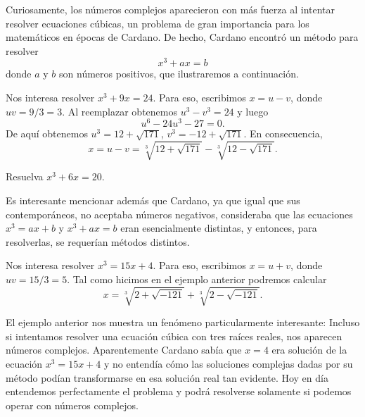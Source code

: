 Curiosamente, los números complejos aparecieron con más fuerza al intentar
resolver ecuaciones cúbicas, un problema de gran importancia para los
matemáticos en épocas de Cardano. De hecho, Cardano encontró un método para
resolver 
\[
	x^3+ax=b
\]
donde $a$ y $b$ son números positivos, que ilustraremos a continuación.

\begin{example}
	Nos interesa resolver $x^3+9x=24$. Para eso, escribimos $x=u-v$, donde
	$uv=9/3=3$. Al reemplazar obtenemos $u^3-v^3=24$ y luego 
	\[
		u^6-24u^3-27=0. 
	\]
	De aquí obtenemos $u^3=12+\sqrt{171}$, $v^3=-12+\sqrt{171}$. En
	consecuencia, 
	\[
		x=u-v=\sqrt[3]{12+\sqrt{171}}-\sqrt[3]{12-\sqrt{171}}.
	\]
\end{example}

\begin{exercise}
	Resuelva $x^3+6x=20$.
\end{exercise}

Es interesante mencionar además que Cardano, ya que igual que sus
contemporáneos, no aceptaba números negativos, consideraba que las ecuaciones
$x^3=ax+b$ y $x^3+ax=b$ eran esencialmente distintas, y entonces, para
resolverlas, se requerían métodos distintos.

\begin{example}
	Nos interesa resolver $x^3=15x+4$. Para eso, escribimos $x=u+v$, donde
	$uv=15/3=5$. Tal como hicimos en el ejemplo anterior podremos calcular
	\[
		x=\sqrt[3]{2+\sqrt{-121}}+\sqrt[3]{2-\sqrt{-121}}.
	\]

\end{example}

El ejemplo anterior nos muestra un fenómeno particularmente interesante:
Incluso si intentamos resolver una ecuación cúbica con tres raíces reales, nos
aparecen números complejos. Aparentemente Cardano sabía que $x=4$ era solución
de la ecuación $x^3=15x+4$ y no entendía cómo las soluciones complejas dadas
por su método podían transformarse en esa solución real tan evidente. Hoy en
día entendemos perfectamente el problema y podrá resolverse solamente si
podemos operar con números complejos. 



%

